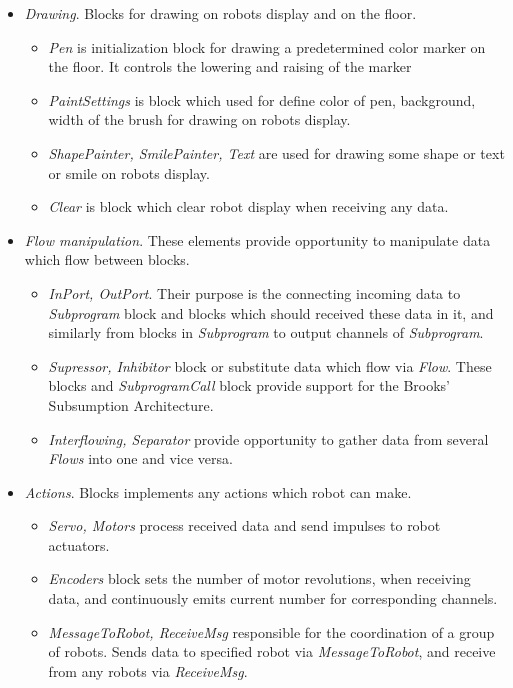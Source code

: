 \documentclass[conference,compsoc]{IEEEtran}
\begin{document}
\begin{itemize}
\begin{itemize}
\end{itemize} 
\item \textit{Drawing}. Blocks for drawing on robots display and on the floor.
\begin{itemize}
\item \textit{Pen} is initialization block for drawing a predetermined color marker on the floor.  It controls the lowering and raising of the marker
\item \textit{PaintSettings} is block which used for define color of pen, background, width of the brush for drawing on robots display.
\item \textit{ShapePainter, SmilePainter, Text} are used for drawing some shape or text or smile on robots display. 
\item \textit{Clear} is block which clear robot display when receiving any data.
\end{itemize} 
\item \textit{Flow manipulation}. These elements provide opportunity to manipulate data which flow between blocks.
\begin{itemize}
\item \textit{InPort, OutPort}. Their purpose is the connecting incoming data to \textit{Subprogram} block and blocks which should received these data in it, and similarly from blocks in \textit{Subprogram} to output channels of \textit{Subprogram}. 
\item \textit{Supressor, Inhibitor} block or substitute data which flow via \textit{Flow}. These blocks and \textit{SubprogramCall} block provide support for the Brooks' Subsumption Architecture. 
\item \textit{Interflowing, Separator} provide opportunity to gather data from several \textit{Flows} into one and vice versa.
\end{itemize} 
\item \textit{Actions}. Blocks implements any actions which robot can make.
\begin{itemize}
\item \textit{Servo, Motors} process received data and send impulses to robot actuators.
\item \textit{Encoders} block sets the number of motor revolutions, when receiving data, and continuously emits current number for corresponding channels.
\item \textit{MessageToRobot, ReceiveMsg} responsible for the coordination of a group of robots. Sends data to specified robot via \textit{MessageToRobot}, and receive from any robots via \textit{ReceiveMsg}.

\end{itemize}
\end{itemize}
\end{document}
